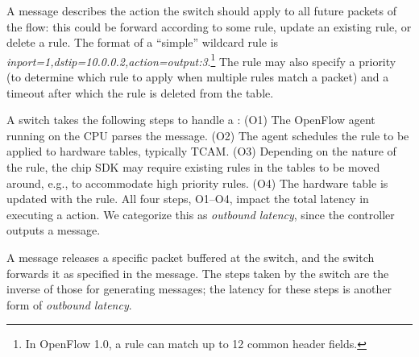 A \flowmod message describes the action the switch should apply to
all future packets of the flow: this could be forward according to some rule,
update an existing rule, or delete a rule. The format of a ``simple''
wildcard rule is \emph{inport=1,dstip=10.0.0.2,action=output:3}.\footnote{In
OpenFlow 1.0, a rule can match up to 12 common header fields.}
The rule may also specify a priority (to determine which rule to apply when
multiple rules match a packet) and a timeout after which the rule is deleted
from the table. 

A switch takes the following steps to handle a \flowmod: (O1) The
OpenFlow agent running on the CPU parses the message. (O2) The agent
schedules the rule to be applied to hardware tables, typically TCAM.  (O3)
Depending on the nature of the rule, the chip SDK may require existing rules
in the tables to be moved around, e.g., to accommodate high priority rules.
(O4) The hardware table is updated with the rule.  All four steps, O1--O4,
impact the total latency in executing a \flowmod action. We categorize this
as {\em outbound latency}, since the controller outputs a \flowmod message.

A \packetout message releases a specific packet buffered at the switch, and
the switch forwards it as specified in the message. The steps taken by the
switch are the inverse of those for generating \packetin messages; the
latency for these steps is another form of {\em outbound latency}.

